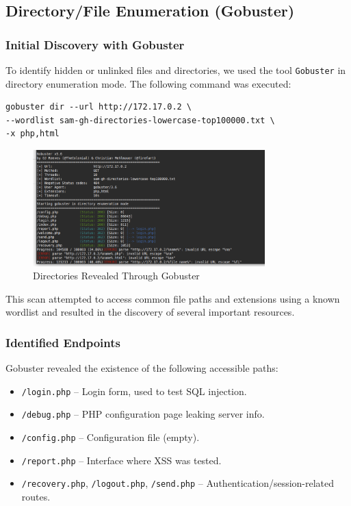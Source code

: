 \documentclass[12pt]{article}
\begin{document}
\subsection{Directory/File Enumeration (Gobuster)}

\subsubsection{Initial Discovery with Gobuster}
To identify hidden or unlinked files and directories, we used the tool \texttt{Gobuster} \cite{gobuster-kali} in directory enumeration mode. The following command was executed:

\begin{verbatim}
gobuster dir --url http://172.17.0.2 \
--wordlist sam-gh-directories-lowercase-top100000.txt \
-x php,html
\end{verbatim}

\begin{figure}[h!]
\centering
\includegraphics[width=0.8\textwidth]{PT6.png}
\caption{Directories Revealed Through Gobuster}
\label{fig:sql_injection}
\end{figure}

\FloatBarrier

This scan attempted to access common file paths and extensions using a known wordlist and resulted in the discovery of several important resources.

\subsubsection{Identified Endpoints}
Gobuster revealed the existence of the following accessible paths:

\begin{itemize}
    \item \texttt{/login.php} – Login form, used to test SQL injection.
    \item \texttt{/debug.php} – PHP configuration page leaking server info.
    \item \texttt{/config.php} – Configuration file (empty).
    \item \texttt{/report.php} – Interface where XSS was tested.
    \item \texttt{/recovery.php}, \texttt{/logout.php}, \texttt{/send.php} – Authentication/session-related routes.
\end{itemize}
\end{document}
